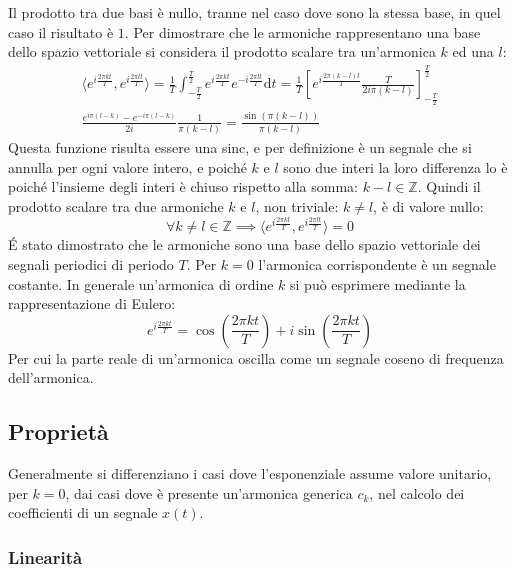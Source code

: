 \documentclass{article}
\newcommand{\df}{\mathrm{d}}
\numberwithin{equation}{subsection}
\begin{document}
Il prodotto tra due basi è nullo, tranne nel caso dove sono la stessa base, in quel caso il risultato è $1$. Per dimostrare che le armoniche rappresentano una base dello 
spazio vettoriale si considera il prodotto scalare tra un'armonica $k$ ed una $l$:
\begin{gather*}
    \langle e^{i\frac{2\pi kt}{T}},e^{i\frac{2\pi lt}{T}}\rangle=\displaystyle\frac{1}{T}\int_{-\frac{T}{2}}^{\frac{T}{2}}e^{i\frac{2\pi kt}{T}}e^{-i\frac{2\pi lt}{T}}\df t=
    \frac{1}{T}\left[e^{i\frac{2\pi(k-l)t}{T}}\frac{T}{2i\pi (k-l)}\right]^{\frac{T}{2}}_{-\frac{T}{2}}\\
    \displaystyle\frac{e^{i\pi(l-k)}-e^{-i\pi(l-k)}}{2i}\frac{1}{\pi (k-l)}=\frac{\sin(\pi(k-l))}{\pi (k-l)}
\end{gather*} 
Questa funzione risulta essere una sinc, e per definizione è un segnale che si annulla per ogni valore intero, e poiché $k$ e $l$ sono due interi la loro differenza lo è 
poiché l'insieme degli interi è chiuso rispetto alla somma: $k-l\in\mathbb{Z}$. Quindi il prodotto scalare tra due armoniche $k$ e $l$, non triviale: $k\neq l$, è di valore 
nullo:
\begin{equation*}
    \forall k\neq l\in\mathbb{Z}\implies \langle e^{i\frac{2\pi kt}{T}},e^{i\frac{2\pi lt}{T}}\rangle=0
\end{equation*}
\'{E} stato dimostrato che le armoniche sono una base dello spazio vettoriale dei segnali periodici di periodo $T$. 
Per $k=0$ l'armonica corrispondente è un segnale costante. In generale un'armonica di ordine $k$ si può esprimere mediante la rappresentazione di Eulero:
\begin{equation*}
    \displaystyle e^{i\frac{2\pi kt}{T}}=\cos\left(\frac{2\pi kt}{T}\right)+i\sin\left(\frac{2\pi kt}{T}\right)
\end{equation*}
Per cui la parte reale di un'armonica oscilla come un segnale coseno di frequenza dell'armonica. 

\subsection{Proprietà}

Generalmente si differenziano i casi dove l'esponenziale assume valore unitario, per $k=0$, dai casi dove è presente un'armonica generica $c_k$, nel calcolo 
dei coefficienti di un segnale $x(t)$. 
\subsubsection{Linearità}
\end{document}
